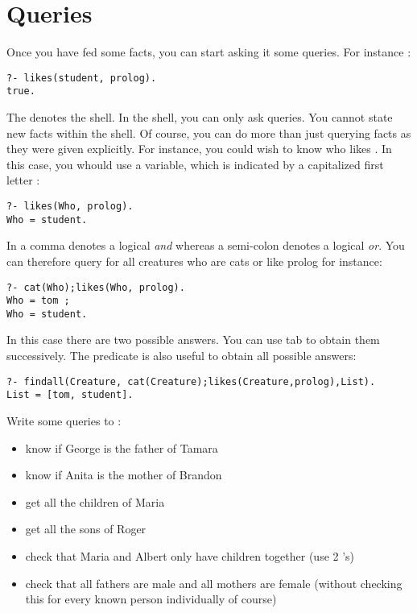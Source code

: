 \documentclass{../../../tp}
\begin{document}
\section{Queries}
 
Once you have fed \prolog some facts, you can start asking it some queries. For instance :

\begin{verbatim}
?- likes(student, prolog).
true.
\end{verbatim}

The  denotes the \prolog shell. In the shell, you can only ask queries. You cannot state new facts within the shell. Of course, you can do more than just querying facts as they were given explicitly. For instance, you could wish to know who likes \prolog. In this case, you whould use a variable, which is indicated by a capitalized first letter :

\begin{verbatim}
?- likes(Who, prolog).
Who = student.
\end{verbatim}

In \prolog a comma \prologcode{,} denotes a logical \emph{and} whereas a semi-colon denotes a logical \emph{or}. You can therefore query for all creatures who are cats or like prolog for instance:

\begin{verbatim}
?- cat(Who);likes(Who, prolog).
Who = tom ;
Who = student.
\end{verbatim}

In this case there are two possible answers. You can use tab to obtain them successively. The  predicate is also useful to obtain all possible answers:

\begin{verbatim}
?- findall(Creature, cat(Creature);likes(Creature,prolog),List).
List = [tom, student].
\end{verbatim}


\begin{instruction}
	Write some queries to :
	\begin{itemize}
		\item know if George is the father of Tamara
		\item know if Anita is the mother of Brandon
		\item get all the children of Maria
		\item get all the sons of Roger
		\item check that Maria and Albert only have children together (use 2 's)
		\item check that all fathers are male and all mothers are female (without checking this for every known person individually of course)
	\end{itemize}
\end{instruction}
\end{document}
